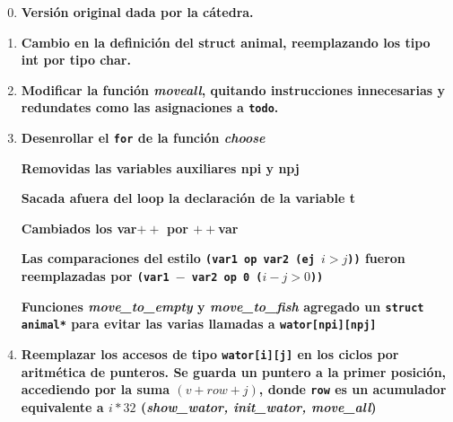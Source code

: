 \documentclass[a4paper,10pt]{article}
\begin{document}
\begin{enumerate}
\setcounter{enumi}{-1}

 \item \textbf {Versi\'on original dada por la c\'atedra.}
 
 \item \textbf {Cambio en la definici\'on del struct animal, reemplazando los tipo int por tipo char.}
 
 \item \textbf {Modificar la funci\'on \textit{moveall}, quitando instrucciones innecesarias y redundates como las asignaciones a \texttt{todo}.}
 
 \item \textbf {Desenrollar el \texttt{for} de la funci\'on \textit{choose}} 
	
	\textbf {Removidas las variables auxiliares npi y npj}
	
	\textbf {Sacada afuera del loop la declaraci\'on de la variable t}
	
	\textbf {Cambiados los var$++$ por $++$var}
	
	\textbf {Las comparaciones del estilo \texttt{(var1 op var2 (ej $i > j$))} fueron reemplazadas por \texttt{(var1 $-$ var2 op 0 ($i - j > 0$))}}
	
	\textbf {Funciones \textit{move\_to\_empty} y \textit{move\_to\_fish} agregado un \texttt{struct animal*} para evitar las varias llamadas a \texttt{wator[npi][npj]}}
		
 \item  \textbf{Reemplazar los accesos de tipo \texttt{wator[i][j]} en los ciclos por aritm\'etica de punteros. Se guarda un puntero a la primer posici\'on, accediendo por la suma $(v + row +j)$, donde \texttt{row} es un acumulador equivalente a $i*32$ (\textit{show\_wator, init\_wator, move\_all})}
	

\end{enumerate}
\end{document}
